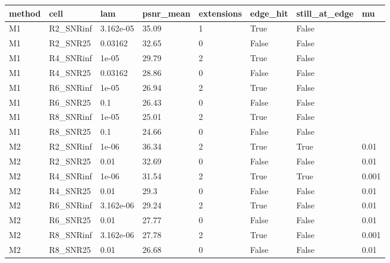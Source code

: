 \begin{tabular}{llllllll}
\hline
method & cell & lam & psnr\_mean & extensions & edge\_hit & still\_at\_edge & mu \\
\hline
M1 & R2\_SNRinf & 3.162e-05 & 35.09 & 1 & True & False &  \\
M1 & R2\_SNR25 & 0.03162 & 32.65 & 0 & False & False &  \\
M1 & R4\_SNRinf & 1e-05 & 29.79 & 2 & True & False &  \\
M1 & R4\_SNR25 & 0.03162 & 28.86 & 0 & False & False &  \\
M1 & R6\_SNRinf & 1e-05 & 26.94 & 2 & True & False &  \\
M1 & R6\_SNR25 & 0.1 & 26.43 & 0 & False & False &  \\
M1 & R8\_SNRinf & 1e-05 & 25.01 & 2 & True & False &  \\
M1 & R8\_SNR25 & 0.1 & 24.66 & 0 & False & False &  \\
M2 & R2\_SNRinf & 1e-06 & 36.34 & 2 & True & True & 0.01 \\
M2 & R2\_SNR25 & 0.01 & 32.69 & 0 & False & False & 0.01 \\
M2 & R4\_SNRinf & 1e-06 & 31.54 & 2 & True & True & 0.001 \\
M2 & R4\_SNR25 & 0.01 & 29.3 & 0 & False & False & 0.01 \\
M2 & R6\_SNRinf & 3.162e-06 & 29.24 & 2 & True & False & 0.01 \\
M2 & R6\_SNR25 & 0.01 & 27.77 & 0 & False & False & 0.01 \\
M2 & R8\_SNRinf & 3.162e-06 & 27.78 & 2 & True & False & 0.001 \\
M2 & R8\_SNR25 & 0.01 & 26.68 & 0 & False & False & 0.01 \\
\hline
\end{tabular}
